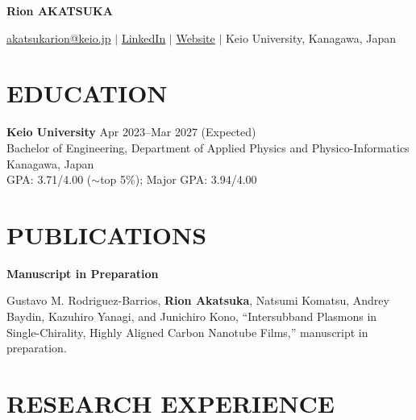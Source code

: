 \documentclass[11pt]{article}
\begin{document}

\begin{center}
    {\LARGE\bfseries Rion AKATSUKA}
    
    
    \vspace{9pt}
    \href{mailto:akatsukarion@keio.jp}{akatsukarion@keio.jp}
    \quad $\vert$ \quad
    \href{https://www.linkedin.com/in/rion-akatsuka-a8742035b/}{LinkedIn}
    \quad $\vert$ \quad
    \href{https://yeonri0.github.io/}{Website}
    \quad $\vert$ \quad
    Keio University, Kanagawa, Japan
\end{center}


\section*{EDUCATION}

\textbf{Keio University}
\hfill Apr 2023--Mar 2027 (Expected) \\
Bachelor of Engineering, Department of Applied Physics and Physico-Informatics
\hfill Kanagawa, Japan \\
GPA: 3.71/4.00 ($\sim$top 5\%); Major GPA: 3.94/4.00



\section*{PUBLICATIONS}
\textbf{Manuscript in Preparation} \\
{\raggedright
Gustavo M. Rodriguez-Barrios, \textbf{Rion Akatsuka},
Natsumi Komatsu, Andrey Baydin, Kazuhiro Yanagi,
and Junichiro Kono,
``Intersubband Plasmons in Single-Chirality, Highly
Aligned Carbon Nanotube Films,'' manuscript in preparation.
\par}


\section*{RESEARCH EXPERIENCE}
\end{document}
